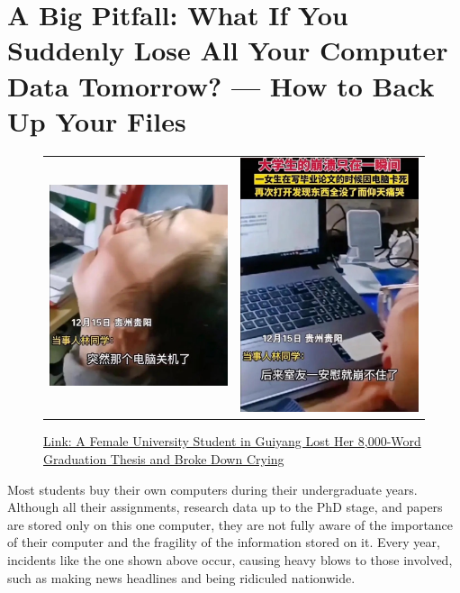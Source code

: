 \section{A Big Pitfall: What If You Suddenly Lose All Your Computer Data Tomorrow? — How to Back Up Your Files}

\begin{figure}[H]
    \begin{tabular}{rl}
        \includegraphics[width=0.5\columnwidth]{author-folder/Kai.Wu/backup1.jpg} &
        \includegraphics[width=0.4\columnwidth]{author-folder/Kai.Wu/backup2.jpg}
    \end{tabular}
    \caption{\href{https://baijiahao.baidu.com/s?id=1719578217211021768}{Link: A Female University Student in Guiyang Lost Her 8,000-Word Graduation Thesis and Broke Down Crying}}
\end{figure}

Most students buy their own computers during their undergraduate years. Although all their assignments, research data up to the PhD stage, and papers are stored only on this one computer, they are not fully aware of the importance of their computer and the fragility of the information stored on it. Every year, incidents like the one shown above occur, causing heavy blows to those involved, such as making news headlines and being ridiculed nationwide.

